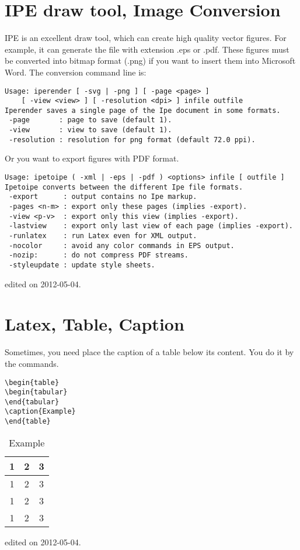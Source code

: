 \section{IPE draw tool, Image Conversion}
IPE is an excellent draw tool, which can create high quality vector figures. For example, it can generate the file with extension .eps or .pdf. These figures must be converted into bitmap format (.png) if you want to insert them into Microsoft Word. The conversion command line is:
\begin{verbatim}
Usage: iperender [ -svg | -png ] [ -page <page> ]
    [ -view <view> ] [ -resolution <dpi> ] infile outfile
Iperender saves a single page of the Ipe document in some formats.
 -page       : page to save (default 1).
 -view       : view to save (default 1).
 -resolution : resolution for png format (default 72.0 ppi).
\end{verbatim}

Or you want to export figures with PDF format.
\begin{verbatim}
Usage: ipetoipe ( -xml | -eps | -pdf ) <options> infile [ outfile ]
Ipetoipe converts between the different Ipe file formats.
 -export      : output contains no Ipe markup.
 -pages <n-m> : export only these pages (implies -export).
 -view <p-v>  : export only this view (implies -export).
 -lastview    : export only last view of each page (implies -export).
 -runlatex    : run Latex even for XML output.
 -nocolor     : avoid any color commands in EPS output.
 -nozip:      : do not compress PDF streams.
 -styleupdate : update style sheets.
\end{verbatim}
\hfill {\tiny  edited on 2012-05-04.}
\section{Latex, Table, Caption}
Sometimes, you need place the caption of a table below its content. You do it by the commands.
\begin{verbatim}
\begin{table}
\begin{tabular}
\end{tabular}
\caption{Example}
\end{table}
\end{verbatim}
\begin{table}[h]
\centering
\begin{tabular}{ccc}
\toprule
1 & 2 &3\\
\midrule
1 & 2 &3\\
1 & 2 &3\\
1 & 2 &3\\
\bottomrule
\end{tabular}
\caption{Example}
\end{table}
\hfill {\tiny  edited on 2012-05-04.}

